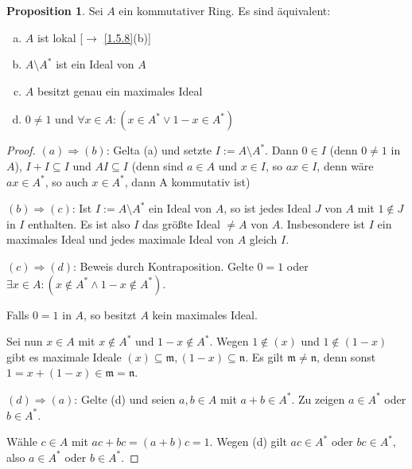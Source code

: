 \documentclass[
twoside=semi,
fontsize=12,
DIV=12, 
cleardoublepage=current,
leqno,
headings=optiontoheadandtoc, 
toc=idx
]{scrbook}
\theoremstyle{definition}
\newtheorem{proposition}[definition]{Proposition}
\begin{document}
 	\begin{proposition}\label{2.6.1}
 		Sei $A$ ein kommutativer Ring. Es sind \"aquivalent:
 		\begin{enumerate}[(a)]
 			\item $A$ ist lokal [$\to$ \ref{1.5.8}(b)]
 			\item $A \setminus A^*$ ist ein Ideal von $A$
 			\item $A$ besitzt genau ein maximales Ideal
 			\item $0\neq 1$ und $\forall x \in A: (x \in A^* \lor 1-x \in A^*)$
 		\end{enumerate}
 	
 		\begin{proof}
 			$(a) \Rightarrow (b)$: Gelta (a) und setzte $I:= A \setminus A^*$. Dann $ 0 \in I$ (denn $0 \neq 1$ in $A$), $I + I \subseteq I$ und 
 			$AI \subseteq I$ (denn sind $a \in A$ und $x \in I$, so $ax \in I$, denn w\"are $ax \in A^*$, so auch $x \in A^*$, dann A kommutativ ist)
 			
 			$(b) \Rightarrow (c)$: Ist $I := A \setminus A^*$ ein Ideal von $A$, so ist jedes Ideal $J$ von $A$ mit $1 \notin J$ in $I$ enthalten. Es ist also $I$ das gr\"o\ss te Ideal $\neq A$ von $A$.
 			Insbesondere ist $I$ ein maximales Ideal und jedes maximale Ideal von $A$ gleich $I$.
 			
 			$(c) \Rightarrow (d)$: Beweis durch Kontraposition. Gelte $0 = 1$ oder $\exists x \in A: (x \notin A^* \land 1-x \notin A^*)$. 
 			
 			Falls $0 = 1$ in $A$, so besitzt $A$ kein maximales Ideal. 
 			
 			Sei nun $x \in A$ mit $x \notin A^*$ und $1-x \notin A^*$. Wegen $1 \notin (x)$ und $1 \notin (1-x)$ gibt es maximale Ideale $(x) \subseteq \mathfrak{m}, (1-x) \subseteq \mathfrak{n}$. Es gilt $\mathfrak{m} \neq \mathfrak{n}$, denn sonst $1 = x + (1-x) \in \mathfrak{m} = \mathfrak{n}$.
 			
 			$(d) \Rightarrow (a)$: Gelte (d) und seien $a, b \in A$ mit $a+b \in A^*$. Zu zeigen $a \in A^*$ oder $b \in A^*$.
 			
 			W\"ahle $c \in A$ mit $ac+ bc = (a+b)c = 1$. Wegen (d) gilt $ac \in A^*$ oder $bc \in A^*$, also $a \in A^*$ oder $b \in A^*$.
 		\end{proof}
 	\end{proposition}
 
\end{document}
